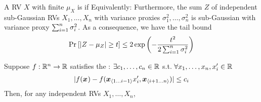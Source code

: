 \documentclass[11pt]{article}
\renewcommand\vec[2][]{\bm{#2}_{#1}}
\begin{document}
\begin{comment}
\begin{example}[Weakness of Chebyshev's Inequality]
	If we know that $X \sim \Gauss{0, 1}$, then it is possible to show 
	\begin{align}
		\Prob{ |X - \mu_x | \geq \underbrace{\sigma_X \sqrt{2 \log\lr{2/\delta}} }_{t}   }  
			&~\leq~ \delta 
			\quad \text{for} \quad \delta \eq 2 e^{- \onehalf \frac{t^2}{\sigma_X^2}}
	\end{align}
which is a much tighter bound (exponential rate of decay wrt $t$ compared to quadratic decay of Chebyshev). 
\end{example}
\end{comment}

\begin{definition}
	A RV $X$ with finite $\mu_X$ is  if 
	Equivalently:
	Furthermore, the sum $Z$ of independent sub-Gaussian RVs $X_1, \ldots, X_n$ with variance proxies $\sigma_1^2, \ldots, \sigma_n^2$ is sub-Gaussian with variance proxy $\sum_{i=1}^{n} \sigma_i^2$. As a consequence, we have the tail bound
	\begin{align}
		\text{Pr}_{}\left[ | Z - \mu_Z | \geq t \right] \leq 2 \exp\left(   - \frac{t^2}{2 \sum_{i=1}^{n} \sigma_i^2}  \right) 
	\end{align}
\end{definition}

\begin{definition}
	Suppose $f : \mathbb{R}^n \to \mathbb{R}$ satisfies the : $\exists c_1, \ldots, c_n \in \mathbb{R}$ s.t. $\forall x_1, \ldots, x_n, x_i' \in \mathbb{R}$
	\begin{align}
			| f(\vec x) - f(\slice[i-1]{x} x_i', \slice[n][i+1]{x}) | \leq c_i
	\end{align}
	Then, for any independent RVs $X_1, \ldots, X_n$,
\end{definition}
\end{document}
